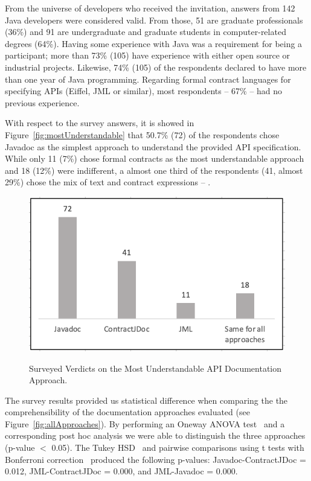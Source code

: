 From the universe of developers who received the invitation, answers from 142 Java developers were considered valid.
From those, 51 are graduate professionals (36\%) and 91 are undergraduate and graduate students in computer-related degrees (64\%).
Having some experience with Java was a requirement for being a participant; more than 73\% (105) have experience with either open source or industrial projects. Likewise, 74\% (105) of the respondents declared to have more than one year of Java programming.
Regarding formal contract languages for specifying APIs (Eiffel, JML or similar), most respondents -- 67\% -- had no previous experience. 


With respect to the survey answers, it is showed in Figure~\ref{fig:mostUnderstandable} that 50.7\% (72) of the respondents chose Javadoc as the simplest approach to understand the provided API specification. 
While only 11 (7\%) chose formal contracts as the most understandable approach and 18 (12\%) were indifferent, a almost one third of the respondents (41, almost 29\%) chose the mix of text and contract expressions -- \contractjdoc{}.


\begin{figure}
\centering
\includegraphics[width=0.7\linewidth]{figs/mostUnderstandable.png}
\label{fig:mostUnderstandable}
\caption{Surveyed Verdicts on the Most Understandable API Documentation Approach.}
\label{fig:surveyResults}
\end{figure}





The survey results provided us statistical difference when comparing the the
comprehensibility of the documentation approaches evaluated (see
Figure~\ref{fig:allApproaches}). By performing an Oneway ANOVA test~\cite{statistical} and
a corresponding post hoc analysis we were able to distinguish the three
approaches (p-value $<$ 0.05).
The Tukey HSD~\cite{statistical} and pairwise comparisons using t tests
with Bonferroni correction~\cite{statistical} produced the following p-values:
Javadoc-ContractJDoc = 0.012, JML-ContractJDoc = 0.000, and JML-Javadoc = 0.000.


